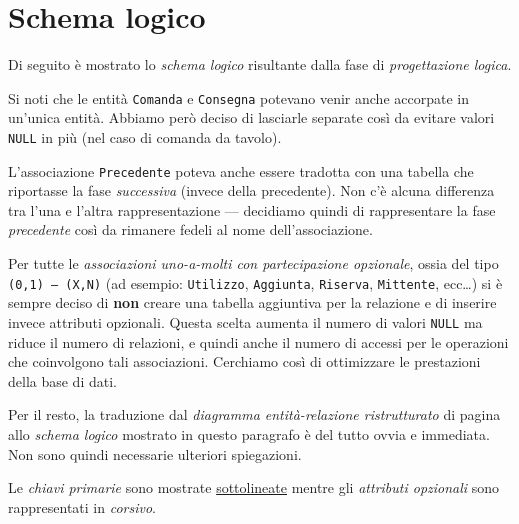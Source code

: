 \section{Schema logico}\label{sec:scheme}
Di seguito è mostrato lo {\it schema logico} risultante dalla fase di {\it progettazione logica}.

\vspace{10pt}
Si noti che le entità {\tt Comanda} e {\tt Consegna} potevano venir anche accorpate in un'unica entità. Abbiamo
però deciso di lasciarle separate così da evitare valori {\tt NULL} in più (nel caso di comanda da tavolo).

L'associazione {\tt Precedente} poteva anche essere tradotta con una tabella che riportasse
la fase {\it successiva} (invece della precedente). Non c'è alcuna differenza
tra l'una e l'altra rappresentazione --- decidiamo quindi di rappresentare la fase
{\it precedente} così da rimanere fedeli al nome dell'associazione.

Per tutte le {\it associazioni uno-a-molti con partecipazione opzionale}, ossia del tipo \hbox{\tt (0,1) --- (X,N)} (ad
esempio: {\tt Utilizzo}, {\tt Aggiunta}, {\tt Riserva}, {\tt Mittente}, ecc\ldots) si è sempre
deciso di {\bf non} creare una tabella aggiuntiva per la relazione e di inserire invece
attributi opzionali. Questa scelta aumenta il numero di valori {\tt NULL} ma riduce il numero
di relazioni, e quindi anche il numero di accessi per le operazioni che coinvolgono tali
associazioni. Cerchiamo così di ottimizzare le prestazioni della base di dati.

Per il resto, la traduzione dal {\it diagramma entità-relazione ristrutturato} di pagina \pageref{diagram.2}
allo {\it schema logico} mostrato in questo paragrafo è del tutto ovvia e immediata. Non
sono quindi necessarie ulteriori spiegazioni.

\vspace{10pt}
Le {\it chiavi primarie} sono mostrate \underline{sottolineate} mentre gli {\it attributi opzionali}
sono rappresentati in \textit{corsivo}.

